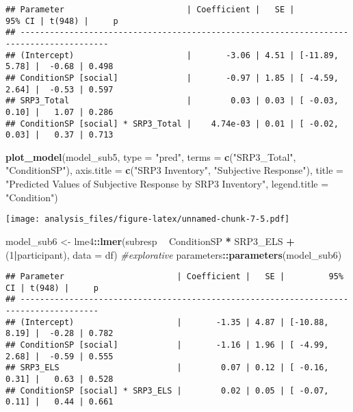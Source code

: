 \documentclass[
]{article}
\newenvironment{Shaded}{\begin{snugshade}}{\end{snugshade}}
\newcommand{\CommentTok}[1]{\textcolor[rgb]{0.56,0.35,0.01}{\textit{#1}}}
\newcommand{\DataTypeTok}[1]{\textcolor[rgb]{0.13,0.29,0.53}{#1}}
\newcommand{\DecValTok}[1]{\textcolor[rgb]{0.00,0.00,0.81}{#1}}
\newcommand{\KeywordTok}[1]{\textcolor[rgb]{0.13,0.29,0.53}{\textbf{#1}}}
\newcommand{\NormalTok}[1]{#1}
\newcommand{\OperatorTok}[1]{\textcolor[rgb]{0.81,0.36,0.00}{\textbf{#1}}}
\newcommand{\StringTok}[1]{\textcolor[rgb]{0.31,0.60,0.02}{#1}}
\begin{document}
\begin{verbatim}
## Parameter                         | Coefficient |   SE |         95% CI | t(948) |     p
## ----------------------------------------------------------------------------------------
## (Intercept)                       |       -3.06 | 4.51 | [-11.89, 5.78] |  -0.68 | 0.498
## ConditionSP [social]              |       -0.97 | 1.85 | [ -4.59, 2.64] |  -0.53 | 0.597
## SRP3_Total                        |        0.03 | 0.03 | [ -0.03, 0.10] |   1.07 | 0.286
## ConditionSP [social] * SRP3_Total |    4.74e-03 | 0.01 | [ -0.02, 0.03] |   0.37 | 0.713
\end{verbatim}

\begin{Shaded}
\begin{Highlighting}[]
\KeywordTok{plot_model}\NormalTok{(model_sub5, }\DataTypeTok{type =} \StringTok{"pred"}\NormalTok{, }\DataTypeTok{terms =} \KeywordTok{c}\NormalTok{(}\StringTok{"SRP3_Total"}\NormalTok{, }\StringTok{"ConditionSP"}\NormalTok{), }\DataTypeTok{axis.title =} \KeywordTok{c}\NormalTok{(}\StringTok{"SRP3 Inventory"}\NormalTok{, }\StringTok{"Subjective Response"}\NormalTok{), }\DataTypeTok{title =} \StringTok{"Predicted Values of Subjective Response by SRP3 Inventory"}\NormalTok{, }\DataTypeTok{legend.title =} \StringTok{"Condition"}\NormalTok{)}
\end{Highlighting}
\end{Shaded}

\texttt{[image: analysis\_files/figure-latex/unnamed-chunk-7-5.pdf]}

\begin{Shaded}
\begin{Highlighting}[]
\NormalTok{model_sub6 <-}\StringTok{ }\NormalTok{lme4}\OperatorTok{::}\KeywordTok{lmer}\NormalTok{(subresp }\OperatorTok{~}\StringTok{ }\NormalTok{ConditionSP }\OperatorTok{*}\StringTok{ }\NormalTok{SRP3_ELS }\OperatorTok{+}\StringTok{ }\NormalTok{(}\DecValTok{1}\OperatorTok{|}\NormalTok{participant), }\DataTypeTok{data =}\NormalTok{ df)  }\CommentTok{#explorative}
\NormalTok{parameters}\OperatorTok{::}\KeywordTok{parameters}\NormalTok{(model_sub6)}
\end{Highlighting}
\end{Shaded}

\begin{verbatim}
## Parameter                       | Coefficient |   SE |         95% CI | t(948) |     p
## --------------------------------------------------------------------------------------
## (Intercept)                     |       -1.35 | 4.87 | [-10.88, 8.19] |  -0.28 | 0.782
## ConditionSP [social]            |       -1.16 | 1.96 | [ -4.99, 2.68] |  -0.59 | 0.555
## SRP3_ELS                        |        0.07 | 0.12 | [ -0.16, 0.31] |   0.63 | 0.528
## ConditionSP [social] * SRP3_ELS |        0.02 | 0.05 | [ -0.07, 0.11] |   0.44 | 0.661
\end{verbatim}
\end{document}
